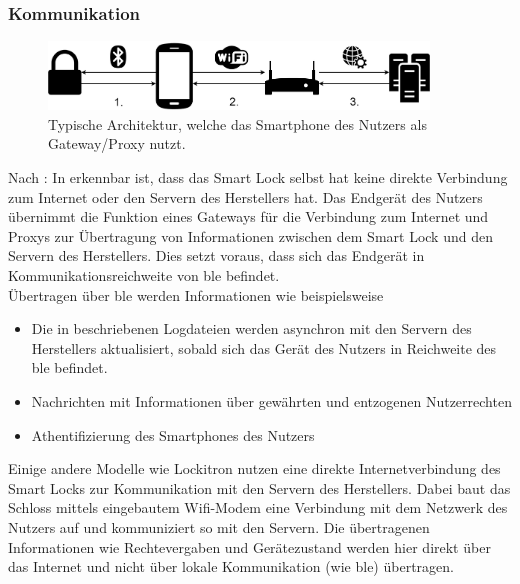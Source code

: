 	\subsubsection{Kommunikation}
	\label{sec:sota_smart_locks_comm}
	    \begin{figure}[H]
    		\centering
    		\includegraphics[width=0.9\textwidth]{graphics/gateway_arch.png}
    		\caption{Typische Architektur, welche das Smartphone des Nutzers als Gateway/Proxy nutzt\cite{Ho2016}.}
    		\label{fig:gateway_arch}
    	\end{figure}
	    Nach \cite{Ho2016}:
        In  erkennbar ist, dass das Smart Lock selbst hat keine direkte Verbindung zum Internet oder den Servern des Herstellers hat. 
        Das Endgerät des Nutzers übernimmt die Funktion eines Gateways für die Verbindung zum Internet und Proxys zur Übertragung von Informationen zwischen dem Smart Lock und den Servern des Herstellers. 
        Dies setzt voraus, dass sich das Endgerät in Kommunikationsreichweite von \gls{ble} befindet. 
        \smallskip\\
        Übertragen über \gls{ble} werden Informationen wie beispielsweise
        \begin{itemize}[noitemsep]
            \item Die in  beschriebenen Logdateien werden asynchron mit den Servern des Herstellers aktualisiert, sobald sich das Gerät des Nutzers in Reichweite des \gls{ble} befindet.
            \item Nachrichten mit Informationen über gewährten und entzogenen Nutzerrechten
            \item Athentifizierung des Smartphones des Nutzers 
        \end{itemize}
        
        \noindent Einige andere Modelle wie Lockitron\cite{lockitron} nutzen eine direkte Internetverbindung des Smart Locks zur Kommunikation mit den Servern des Herstellers. 
        Dabei baut das Schloss mittels eingebautem Wifi-Modem eine Verbindung mit dem Netzwerk des Nutzers auf und kommuniziert so mit den Servern. 
        Die übertragenen Informationen wie Rechtevergaben und Gerätezustand werden hier direkt über das Internet und nicht über lokale Kommunikation (wie \gls{ble}) übertragen. 

